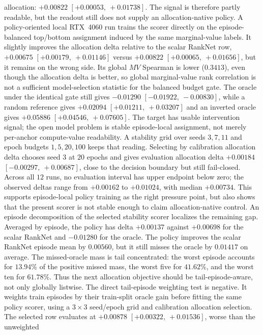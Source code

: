 allocation: $+0.00822$ $[+0.00053,\ +0.01738]$.  The signal is therefore
partly readable, but the readout still does not supply an allocation-native
policy.
A policy-oriented local RTX~4060 run trains the scorer directly on the
episode-balanced top/bottom assignment induced by the same marginal-value
labels.  It slightly improves the allocation delta relative to the scalar
RankNet row, $+0.00675$ $[+0.00179,\ +0.01146]$ versus $+0.00822$
$[+0.00065,\ +0.01656]$, but it remains on the wrong side.  Its global
$MV$ Spearman is lower ($0.3413$), even though the allocation delta is better,
so global marginal-value rank correlation is not a sufficient model-selection
statistic for the balanced budget gate.  The oracle under the identical gate
still gives $-0.01290$ $[-0.01922,\ -0.00830]$, while a random reference gives
$+0.02094$ $[+0.01211,\ +0.03207]$ and an inverted oracle gives $+0.05886$
$[+0.04546,\ +0.07605]$.  The target has usable intervention signal; the open
model problem is stable episode-local assignment, not merely per-anchor
compute-value readability.
A stability grid over seeds $3,7,11$ and epoch budgets $1,5,20,100$ keeps that
reading.  Selecting by calibration allocation delta chooses seed $3$ at $20$
epochs and gives evaluation allocation delta $+0.00184$
$[-0.00297,\ +0.00687]$, close to the decision boundary but still fail-closed.
Across all $12$ runs, no evaluation interval has upper endpoint below zero; the
observed deltas range from $+0.00162$ to $+0.01024$, with median $+0.00734$.
This supports episode-local policy training as the right pressure point, but
also shows that the present scorer is not stable enough to claim
allocation-native control.
An episode decomposition of the selected stability scorer localizes the
remaining gap.  Averaged by episode, the policy has delta $+0.00137$ against
$+0.00698$ for the scalar RankNet and $-0.01280$ for the oracle.  The policy
improves the scalar RankNet episode mean by $0.00560$, but it still misses the
oracle by $0.01417$ on average.  The missed-oracle mass is tail concentrated:
the worst episode accounts for $13.94\%$ of the positive missed mass, the worst
five for $41.62\%$, and the worst ten for $61.78\%$.  Thus the next allocation
objective should be tail-episode-aware, not only globally listwise.
The direct tail-episode weighting test is negative.  It weights train episodes
by their train-split oracle gain before fitting the same policy scorer, using a
$3\times 3$ seed/epoch grid and calibration allocation selection.  The selected
row evaluates at $+0.00878$ $[+0.00322,\ +0.01536]$, worse than the unweighted
